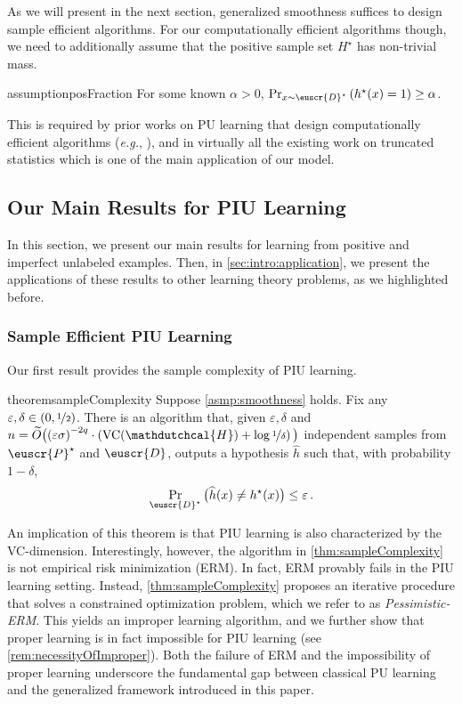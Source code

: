 \documentclass[11pt]{article}
\theoremstyle{plain}
\theoremstyle{definition}
\theoremstyle{remark}
\newcommand{\binparen}[1]{\big(#1\big)}
\newcommand{\inparen}[1]{\left(#1\right)}
\newcommand{\nfrac}[2]{\nicefrac{#1}{#2}}
\newcommand{\vc}{\textrm{\rm VC}}
\newcommand{\eps}{\varepsilon}
\newcommand{\wh}[1]{\widehat{#1}}
\newcommand{\wt}[1]{\widetilde{#1}}
\newcommand{\customcal}[1]{\euscr{#1}}
\newcommand{\cD}{\customcal{D}}
\newcommand{\cP}{\customcal{P}}
\newcommand{\eg}{\textit{e.g.}}
\newcommand{\hypo}[1]{\mathdutchcal{#1}}
\newcommand{\hyH}{\hypo{H}}
\newcommand{\pERM}{Pessimistic-ERM}
\newcommand{\optset}{{H^\star}}
\newcommand{\cDtrue}{\cD^\star}
\newcommand{\cDgiven}{\cD}
\newcommand{\cPtrue}{\cP^\star}
\begin{document}
As we will present in the next section, generalized smoothness suffices to design sample efficient algorithms. For our computationally efficient algorithms though, we need to additionally assume that the positive sample set $\optset$ has non-trivial mass.
\begin{restatable}{assumption}{posFraction}\label{asmp:posFraction}
    For some known $\alpha>0$, $\Pr_{x\sim \cDtrue}\inparen{h^\star(x)=1}\geq \alpha$.
\end{restatable} 

\noindent This is required by prior works on PU learning that design computationally efficient algorithms (\eg{}, \cite{lee2024unknown}), and in virtually all the existing work on truncated statistics \cite{daskalakis2018efficient, Kontonis2019EfficientTS, lee2023learning, lee2024unknown} which is one of the main application of our model.%


\subsection{Our Main Results for PIU Learning}\label{sec:informal}
In this section, we present our main results for learning from positive and imperfect unlabeled examples. Then, in \cref{sec:intro:application}, we present the applications of these results to other learning theory problems, as we highlighted before. %
\subsubsection{Sample Efficient PIU Learning}
Our first result provides the sample complexity of PIU learning.
\begin{restatable}{theorem}{sampleComplexity}
    \label{infthm:sampleComplexity}\label{thm:sampleComplexity}
    Suppose \cref{asmp:smoothness} holds. %
    Fix any $\eps,\delta\in (0,\nfrac{1}{2})$.
    There is an algorithm that, given $\eps,\delta$ and $n=\wt{O}\binparen{{{(\eps \sigma)}}^{-2q}\cdot \inparen{\vc{}(\hyH)+\log{\nfrac{1}{\delta}}}}$ independent samples from $\cPtrue$ and $\cDgiven$, outputs a hypothesis $\wh{h}$ such that, with probability $1-\delta$,
    \[ 
        \Pr_{\cDtrue}\binparen{\wh{h}(x)\neq h^\star(x)}\leq \eps\,.
    \]
\end{restatable}
An implication of this theorem is that PIU learning is also characterized by the VC-dimension. Interestingly, however, the algorithm in \cref{thm:sampleComplexity} is not empirical risk minimization (ERM). In fact, ERM provably fails in the PIU learning setting. Instead, \cref{thm:sampleComplexity} proposes an iterative procedure that solves a constrained optimization problem, which we refer to as \textit{\pERM{}}. This yields an improper learning algorithm, and we further show that proper learning is in fact impossible for PIU learning (see \cref{rem:necessityOfImproper}). Both the failure of ERM and the impossibility of proper learning underscore the fundamental gap between classical PU learning and the generalized framework introduced in this paper. 
\smallskip
\end{document}
